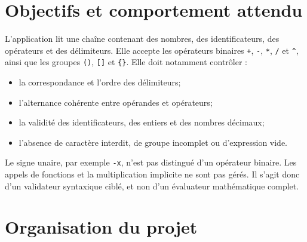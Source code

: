 \documentclass[11pt,a4paper]{article}
\begin{document}
\section{Objectifs et comportement attendu}

L'application lit une chaîne contenant des nombres, des identificateurs, des opérateurs et des délimiteurs. Elle accepte les opérateurs binaires \texttt{+}, \texttt{-}, \texttt{*}, \texttt{/} et \texttt{\string^}, ainsi que les groupes \texttt{()}, \texttt{[]} et \texttt{\{\}}. Elle doit notamment contrôler :

\begin{itemize}
  \item la correspondance et l'ordre des délimiteurs;
  \item l'alternance cohérente entre opérandes et opérateurs;
  \item la validité des identificateurs, des entiers et des nombres décimaux;
  \item l'absence de caractère interdit, de groupe incomplet ou d'expression vide.
\end{itemize}

Le signe unaire, par exemple \texttt{-x}, n'est pas distingué d'un opérateur binaire. Les appels de fonctions et la multiplication implicite ne sont pas gérés. Il s'agit donc d'un validateur syntaxique ciblé, et non d'un évaluateur mathématique complet.

\section{Organisation du projet}
\end{document}
